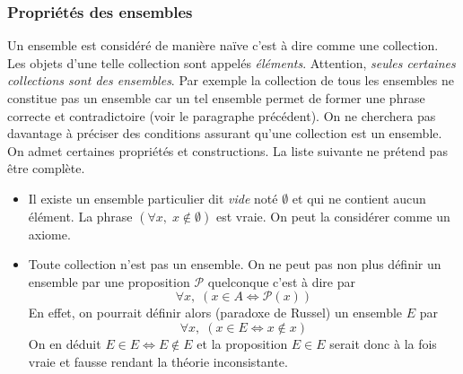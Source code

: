 \subsubsection{Propriétés des ensembles}
 Un ensemble est considéré de manière naïve c'est à dire comme une collection. Les objets d'une telle collection sont appelés \emph{éléments}. Attention, \emph{seules certaines collections sont des ensembles}. Par exemple la collection de tous les ensembles ne constitue pas un ensemble car un tel ensemble permet de former une phrase correcte et contradictoire (voir le paragraphe précédent). On ne cherchera pas davantage à préciser des conditions assurant qu'une collection est un ensemble.\newline
On admet certaines propriétés et constructions. La liste suivante ne prétend pas être complète.
\begin{itemize}
 \item Il existe un ensemble particulier dit \emph{vide} noté $\emptyset$ et qui ne contient aucun élément. La phrase $\left(\forall x,\;  x\notin \emptyset \right) $ est vraie. On peut la considérer comme un axiome. 

\item Toute collection n'est pas un ensemble. \label{paradox}  On ne peut pas non plus définir un ensemble par une proposition $\mathcal{P}$ quelconque c'est à dire par 
\begin{displaymath}
\forall x, \; \left( x\in A \Leftrightarrow  \mathcal{P}(x) \right) 
\end{displaymath}
En effet, on pourrait définir alors (paradoxe de Russel) un ensemble $E$ par
\begin{displaymath}
  \forall x, \; \left( x\in E \Leftrightarrow x \notin x \right) 
\end{displaymath}
On en déduit $E \in E \Leftrightarrow E\notin E$ et la proposition $E\in E$ serait donc à la fois vraie et fausse rendant la théorie inconsistante. 


\end{itemize}
